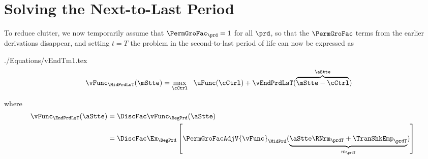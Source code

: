 \documentclass[\econtexRoot/SolvingMicroDSOPs]{subfiles}
\begin{document}
\hypertarget{solving-the-next-to-last-period}{}
\hypertarget{solving-the-next}{}
\section{Solving the Next-to-Last Period}\label{sec:solving-the-next}

To reduce clutter, we now temporarily assume that $\PermGroFac_{\prd}=1$ for all $\prd$, so that the $\PermGroFac$ terms from the earlier derivations disappear, and setting $t=T$ the problem in the second-to-last period of life can now be expressed as
\begin{verbatimwrite}{./Equations/vEndTm1.tex}
\begin{equation}\begin{gathered}\begin{aligned}
  {\vFunc}_{\MidPrdLsT}(\mStte)  & = \max_{\cCtrl} ~~ \uFunc(\cCtrl) +
                              \vEndPrdLsT(\overbrace{\mStte-\cCtrl}^{\aStte})
                              \label{eq:vEndTm1}
\end{aligned}\end{gathered}\end{equation}
\end{verbatimwrite}
\unskip
where 
\begin{equation*}\begin{gathered}\begin{aligned}
  {\vFunc}_{\EndPrdLsT}(\aStte)  & = \DiscFac \vFunc_{\BegPrd}(\aStte) 
\\                          & = \DiscFac \Ex_{\BegPrd} \left[\PermGroFacAdjV {\vFunc}_{\MidPrd}(\underbrace{\aStte \RNrm_{\prdT} + \TranShkEmp_{\prdT}}_{{m}_{\prdT}})\right]
    \end{aligned}\end{gathered}\end{equation*}

\end{document}
